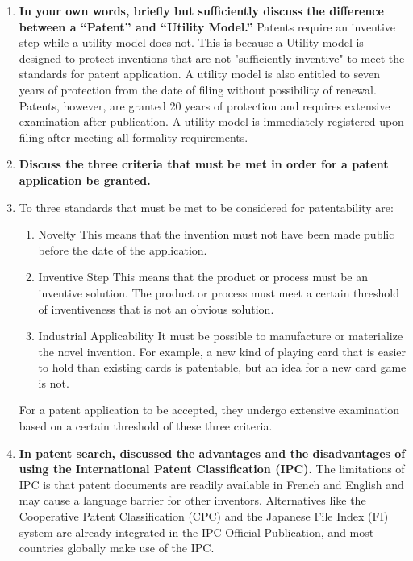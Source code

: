 \documentclass{article}
\begin{document}
\begin{enumerate}
  \item \textbf{In your own words, briefly but sufficiently discuss the difference between a “Patent” and “Utility Model.”}
  \subitem Patents require an inventive step while a utility model does not. This is because a Utility model is designed to protect inventions that are not "sufficiently inventive" to meet the standards for patent application. A utility model is also entitled to seven years of protection from the date of filing without possibility of renewal.
  \subitem Patents, however, are granted 20 years of protection and requires extensive examination after publication. A utility model is immediately registered upon filing after meeting all formality requirements.

  \item \textbf{Discuss the three criteria that must be met in order for a patent application be granted.}
  \item[] To three standards that must be met to be considered for patentability are:
  \begin{enumerate}
    \item Novelty
    \subitem This means that the invention must not have been made public before the date of the application.
    \item Inventive Step
    \subitem This means that the product or process must be an inventive solution. The product or process must meet a certain threshold of inventiveness that is not an obvious solution.
    \item Industrial Applicability
    \subitem It must be possible to manufacture or materialize the novel invention. For example, a new kind of playing card that is easier to hold than existing cards is patentable, but an idea for a new card game is not.
  \end{enumerate}
  \subitem For a patent application to be accepted, they undergo extensive examination based on a certain threshold of these three criteria. 

  \item \textbf{In patent search, discussed the advantages and the disadvantages of using the International Patent Classification (IPC).}
  \subitem The limitations of IPC is that patent documents are readily available in French and English and may cause a language barrier for other inventors. Alternatives like the Cooperative Patent Classification (CPC) and the Japanese File Index (FI) system are already integrated in the IPC Official Publication, and most countries globally make use of the IPC.
  

\end{enumerate}
\end{document}
